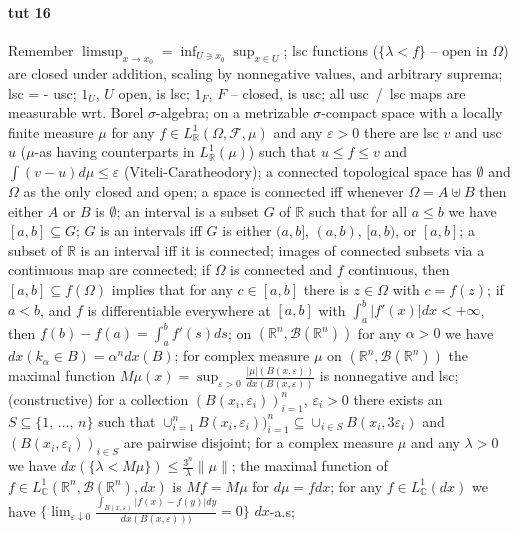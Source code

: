 \documentclass[a4paper]{article}
\newcommand{\Fcal}{\mathcal{F}}
\newcommand{\Bcal}{\mathcal{B}}
\newcommand{\real}{\mathbb{R}}
\newcommand{\cplx}{\mathbb{C}}
\begin{document}


\paragraph{tut 16} %
\label{par:tut_16}

Remember $\limsup_{x\to x_0} = \inf_{U\ni x_0} \sup_{x\in U}$;
lsc functions ($\{\lambda < f\}$ -- open in $\Omega$) are closed under addition, scaling by nonnegative values, and arbitrary suprema;
lsc = - usc;
$1_U$, $U$ open, is lsc;
$1_F$, $F$ -- closed, is usc;
all usc~/~lsc maps are measurable wrt. Borel $\sigma$-algebra;
on a metrizable $\sigma$-compact space with a locally finite measure $\mu$ for any $f \in L^1_\real(\Omega, \Fcal, \mu)$ and any $\varepsilon > 0$ there are lsc $v$ and usc $u$ ($\mu$-as having counterparts in $L^1_\real(\mu)$) such that $u \leq f \leq v$ and $\int (v - u) d\mu \leq \varepsilon$ (Viteli-Caratheodory);
a connected topological space has $\emptyset$ and $\Omega$ as the only closed and open;
a space is connected iff whenever $\Omega = A \uplus B$ then either $A$ or $B$ is $\emptyset$;
an interval is a subset $G$ of $\real$ such that for all $a \leq b$ we have $[a, b] \subseteq G$;
$G$ is an intervals iff $G$ is either $(a, b]$, $(a, b)$, $[a, b)$, or $[a, b]$;
a subset of $\real$ is an interval iff it is connected;
images of connected subsets via a continuous map are connected;
if $\Omega$ is connected and $f$ continuous, then $[a, b] \subseteq f(\Omega)$ implies that for any $c \in [a, b]$ there is $z \in \Omega$ with $c = f(z)$;
if $a < b$, and $f$ is differentiable everywhere at $[a, b]$ with $\int_a^b | f'(x)| dx < + \infty$, then $f(b) - f(a) = \int_a^b f'(s) ds$;
on $(\real^n, \Bcal(\real^n))$ for any $\alpha > 0$ we have $dx({k_\alpha \in B}) = \alpha^n dx(B)$;
for complex measure $\mu$ on $(\real^n, \Bcal(\real^n))$ the maximal function $M\mu(x) = \sup_{\varepsilon>0} \tfrac{|\mu|(B(x,\varepsilon))}{dx(B(x,\varepsilon))}$ is nonnegative and lsc;
(constructive) for a collection $(B(x_i,\varepsilon_i))_{i=1}^n$, $\varepsilon_i > 0$ there exists an $S \subseteq \{1,\,\ldots,\,n\}$ such that $\cup_{i=1}^n B(x_i,\varepsilon_i))_{i=1}^n \subseteq \cup_{i\in S} B(x_i, 3\varepsilon_i)$ and $(B(x_i,\varepsilon_i))_{i\in S}$ are pairwise disjoint;
for a complex measure $\mu$ and any $\lambda > 0$ we have $dx(\{\lambda < M\mu\}) \leq \tfrac{3^n}{\lambda} \|\mu\|$;
the maximal function of $f \in L^1_\cplx(\real^n, \Bcal(\real^n), dx)$ is $M f = M \mu$ for $d\mu = f dx$;
for any $f \in L^1_\cplx(dx)$ we have $\bigl\{\lim_{\varepsilon \downarrow 0} \tfrac{\int_{B(x, \varepsilon)} |f(x) - f(y)| dy}{dx(B(x, \varepsilon)))} = 0\bigr\}$ $dx$-a.s;
\end{document}
